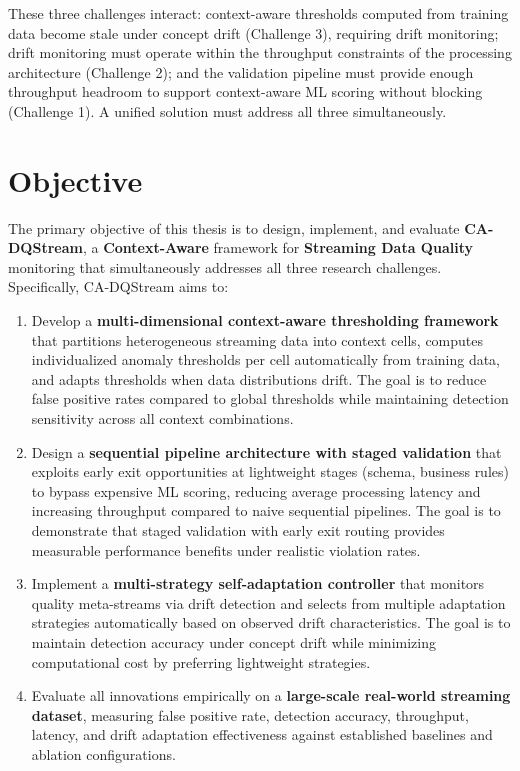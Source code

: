 These three challenges interact: context-aware thresholds computed from training data become stale under concept drift (Challenge 3), requiring drift monitoring; drift monitoring must operate within the throughput constraints of the processing architecture (Challenge 2); and the validation pipeline must provide enough throughput headroom to support context-aware ML scoring without blocking (Challenge 1). A unified solution must address all three simultaneously.

\section{Objective}

The primary objective of this thesis is to design, implement, and evaluate \textbf{CA-DQStream}, a \textbf{Context-Aware} framework for \textbf{Streaming Data Quality} monitoring that simultaneously addresses all three research challenges. Specifically, CA-DQStream aims to:

\begin{enumerate}
    \item Develop a \textbf{multi-dimensional context-aware thresholding framework} that partitions heterogeneous streaming data into context cells, computes individualized anomaly thresholds per cell automatically from training data, and adapts thresholds when data distributions drift. The goal is to reduce false positive rates compared to global thresholds while maintaining detection sensitivity across all context combinations.

    \item Design a \textbf{sequential pipeline architecture with staged validation} that exploits early exit opportunities at lightweight stages (schema, business rules) to bypass expensive ML scoring, reducing average processing latency and increasing throughput compared to naive sequential pipelines. The goal is to demonstrate that staged validation with early exit routing provides measurable performance benefits under realistic violation rates.

    \item Implement a \textbf{multi-strategy self-adaptation controller} that monitors quality meta-streams via drift detection and selects from multiple adaptation strategies automatically based on observed drift characteristics. The goal is to maintain detection accuracy under concept drift while minimizing computational cost by preferring lightweight strategies.

    \item Evaluate all innovations empirically on a \textbf{large-scale real-world streaming dataset}, measuring false positive rate, detection accuracy, throughput, latency, and drift adaptation effectiveness against established baselines and ablation configurations.
\end{enumerate}

